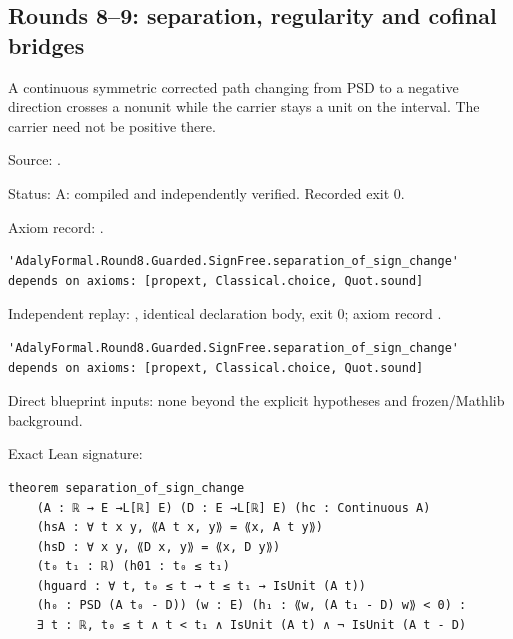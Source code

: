 \subsection{Rounds 8–9: separation, regularity and cofinal bridges}

\begin{theorem}[bp-069]
\label{bp-069}
\uses{}
\leanok
A continuous symmetric corrected path changing from PSD to a negative direction crosses a nonunit while the carrier stays a unit on the interval. The carrier need not be positive there.

\par Source: \texttt{}.
\par Status: A: compiled and independently verified. Recorded exit 0.
\par Axiom record: \texttt{}.
\begin{verbatim}
'AdalyFormal.Round8.Guarded.SignFree.separation_of_sign_change' depends on axioms: [propext, Classical.choice, Quot.sound]
\end{verbatim}
\par Independent replay: \texttt{}, identical declaration body, exit 0; axiom record \texttt{}.
\begin{verbatim}
'AdalyFormal.Round8.Guarded.SignFree.separation_of_sign_change' depends on axioms: [propext, Classical.choice, Quot.sound]
\end{verbatim}
\par Direct blueprint inputs: none beyond the explicit hypotheses and frozen/Mathlib background.
\par Exact Lean signature:
\begin{verbatim}
theorem separation_of_sign_change
    (A : ℝ → E →L[ℝ] E) (D : E →L[ℝ] E) (hc : Continuous A)
    (hsA : ∀ t x y, ⟪A t x, y⟫ = ⟪x, A t y⟫)
    (hsD : ∀ x y, ⟪D x, y⟫ = ⟪x, D y⟫)
    (t₀ t₁ : ℝ) (h01 : t₀ ≤ t₁)
    (hguard : ∀ t, t₀ ≤ t → t ≤ t₁ → IsUnit (A t))
    (h₀ : PSD (A t₀ - D)) (w : E) (h₁ : ⟪w, (A t₁ - D) w⟫ < 0) :
    ∃ t : ℝ, t₀ ≤ t ∧ t < t₁ ∧ IsUnit (A t) ∧ ¬ IsUnit (A t - D)
\end{verbatim}
\end{theorem}

